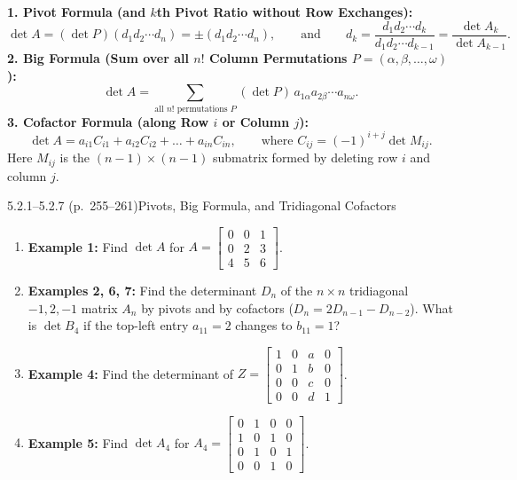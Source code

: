 \documentclass[11pt,a4paper,openany,oneside]{book}
\numberwithin{equation}{chapter}
\begin{document}
\begin{result}
\textbf{1. Pivot Formula (and $k$th Pivot Ratio without Row Exchanges):}
\begin{equation}
\det A = (\det P)(d_1 d_2 \cdots d_n) = \pm(d_1 d_2 \cdots d_n), \qquad \text{and} \qquad d_k = \frac{d_1 d_2 \cdots d_k}{d_1 d_2 \cdots d_{k-1}} = \frac{\det A_k}{\det A_{k-1}}.
\end{equation}
\textbf{2. Big Formula (Sum over all $n!$ Column Permutations $P = (\alpha, \beta, \dots, \omega)$):}
\begin{equation}
\det A = \sum_{\text{all } n!\text{ permutations } P} (\det P)\, a_{1\alpha}a_{2\beta}\cdots a_{n\omega}.
\end{equation}
\textbf{3. Cofactor Formula (along Row $i$ or Column $j$):}
\begin{equation}
\det A = a_{i1}C_{i1} + a_{i2}C_{i2} + \dots + a_{in}C_{in}, \qquad \text{where } C_{ij} = (-1)^{i+j}\det M_{ij}.
\end{equation}
Here $M_{ij}$ is the $(n-1)\times(n-1)$ submatrix formed by deleting row $i$ and column $j$.
\end{result}

\begin{example}{5.2.1--5.2.7 (p.\ 255--261)}{Pivots, Big Formula, and Tridiagonal Cofactors}
\begin{enumerate}
\item \textbf{Example 1:} Find $\det A$ for $A = \begin{bmatrix}0&0&1\\0&2&3\\4&5&6\end{bmatrix}$.
\item \textbf{Examples 2, 6, 7:} Find the determinant $D_n$ of the $n\times n$ tridiagonal $-1,2,-1$ matrix $A_n$ by pivots and by cofactors ($D_n = 2D_{n-1} - D_{n-2}$). What is $\det B_4$ if the top-left entry $a_{11}=2$ changes to $b_{11}=1$?
\item \textbf{Example 4:} Find the determinant of $Z = \begin{bmatrix}1&0&a&0\\0&1&b&0\\0&0&c&0\\0&0&d&1\end{bmatrix}$.
\item \textbf{Example 5:} Find $\det A_4$ for $A_4 = \begin{bmatrix}0&1&0&0\\1&0&1&0\\0&1&0&1\\0&0&1&0\end{bmatrix}$.
\end{enumerate}
\end{example}
\end{document}
